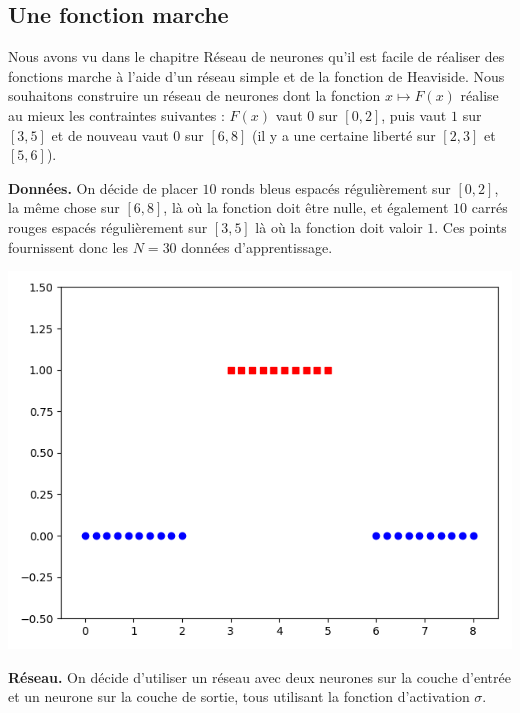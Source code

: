 \documentclass[11pt,class=report,crop=false]{standalone}
\begin{document}
\subsection{Une fonction marche}

Nous avons vu dans le chapitre  \og{}Réseau de neurones\fg{} qu'il est facile de réaliser des fonctions \og{}marche\fg{} à l'aide d'un réseau simple et de la fonction de Heaviside.
Nous souhaitons construire un réseau de neurones dont la fonction $x \mapsto F(x)$ réalise au mieux les contraintes suivantes : $F(x)$ vaut $0$ sur $[0,2]$, puis vaut $1$ sur $[3,5]$ et de nouveau vaut
$0$ sur $[6,8]$ (il y a une certaine liberté sur $[2,3]$ et $[5,6]$).


\bigskip

\textbf{Données.}
On décide de placer $10$ ronds bleus espacés régulièrement sur $[0,2]$, la même chose sur 
$[6,8]$, là où la fonction doit être nulle, et également $10$ carrés rouges espacés régulièrement sur $[3,5]$ là où la fonction doit valoir $1$. Ces points fournissent donc les $N=30$ données d'apprentissage. 

\begin{center}
\includegraphics[scale=\myscale,scale=0.4]{figures/retro_03_a}
\end{center}

\bigskip

\textbf{Réseau.}
On décide d'utiliser un réseau avec deux neurones sur la couche d'entrée et un neurone sur la couche de sortie, tous utilisant la fonction d'activation $\sigma$.
\end{document}
